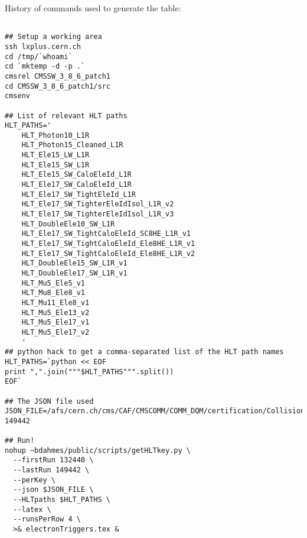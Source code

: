 \documentclass[a4paper,10pt]{article}
\begin{document}
History of commands used to generate the table:
\begin{verbatim}

## Setup a working area
ssh lxplus.cern.ch
cd /tmp/`whoami`
cd `mktemp -d -p .`
cmsrel CMSSW_3_8_6_patch1
cd CMSSW_3_8_6_patch1/src
cmsenv

## List of relevant HLT paths
HLT_PATHS='
    HLT_Photon10_L1R
    HLT_Photon15_Cleaned_L1R
    HLT_Ele15_LW_L1R
    HLT_Ele15_SW_L1R
    HLT_Ele15_SW_CaloEleId_L1R
    HLT_Ele17_SW_CaloEleId_L1R
    HLT_Ele17_SW_TightEleId_L1R
    HLT_Ele17_SW_TighterEleIdIsol_L1R_v2
    HLT_Ele17_SW_TighterEleIdIsol_L1R_v3
    HLT_DoubleEle10_SW_L1R
    HLT_Ele17_SW_TightCaloEleId_SC8HE_L1R_v1
    HLT_Ele17_SW_TightCaloEleId_Ele8HE_L1R_v1
    HLT_Ele17_SW_TightCaloEleId_Ele8HE_L1R_v2
    HLT_DoubleEle15_SW_L1R_v1
    HLT_DoubleEle17_SW_L1R_v1
    HLT_Mu5_Ele5_v1
    HLT_Mu8_Ele8_v1
    HLT_Mu11_Ele8_v1
    HLT_Mu5_Ele13_v2
    HLT_Mu5_Ele17_v1
    HLT_Mu5_Ele17_v2
    '
## python hack to get a comma-separated list of the HLT path names
HLT_PATHS=`python << EOF
print ",".join("""$HLT_PATHS""".split())
EOF`

## The JSON file used
JSON_FILE=/afs/cern.ch/cms/CAF/CMSCOMM/COMM_DQM/certification/Collisions10/7TeV/DCSOnly/DCSTRONLY_132440-149442

## Run!
nohup ~bdahmes/public/scripts/getHLTkey.py \
  --firstRun 132440 \
  --lastRun 149442 \
  --perKey \
  --json $JSON_FILE \
  --HLTpaths $HLT_PATHS \
  --latex \
  --runsPerRow 4 \
  >& electronTriggers.tex &
\end{verbatim}
\end{document}
